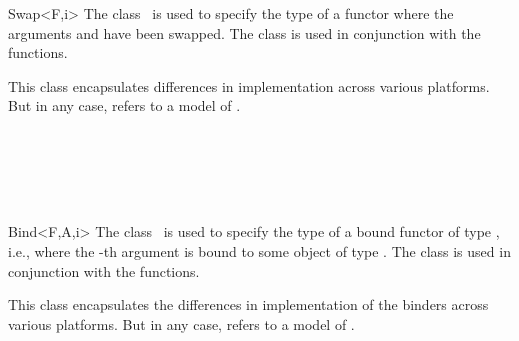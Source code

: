 \begin{ccRefClass}{Swap<F,i>}
  \ccDefinition The class \ccRefName\ is used to specify the type of a
  functor where the arguments  and  have been swapped.
  The class is used in conjunction with the  functions.


  \ccTypes
  
   This class encapsulates differences in
  implementation across various platforms. But in any case, 
  refers to a model of .

  \ccSeeAlso
  \\
  \\
  \\
  \\
  
\end{ccRefClass}

\begin{ccRefClass}{Bind<F,A,i>}
  \ccDefinition The class \ccRefName\ is used to specify the type of a
  bound functor of type , i.e., where the -th argument is
  bound to some object of type . The class is used in
  conjunction with the  functions.


  \ccTypes
  
   This class encapsulates the differences in
  implementation of the binders across various platforms. But in any
  case,  refers to a model of .

  \ccSeeAlso
  \\
  \\
  \\
  \\
  \\ 
  
\end{ccRefClass}

